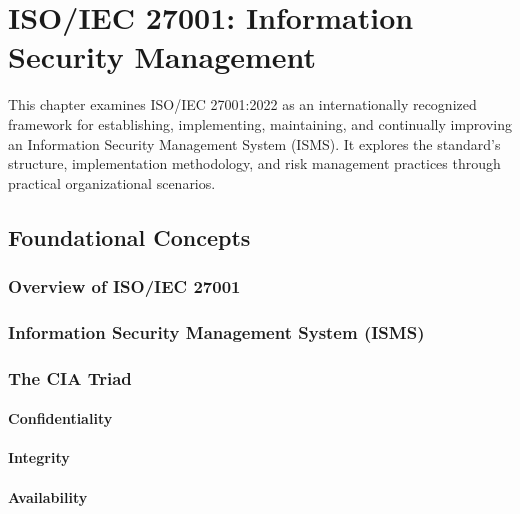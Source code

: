 
\chapter{ISO/IEC 27001: Information Security Management}

This chapter examines ISO/IEC 27001:2022 as an internationally recognized framework for establishing, implementing, maintaining, and continually improving an Information Security Management System (ISMS). It explores the standard's structure, implementation methodology, and risk management practices through practical organizational scenarios.

\section{Foundational Concepts}

\subsection{Overview of ISO/IEC 27001}


\subsection{Information Security Management System (ISMS)}


\subsection{The CIA Triad}

\subsubsection{Confidentiality}

\subsubsection{Integrity}

\subsubsection{Availability}

